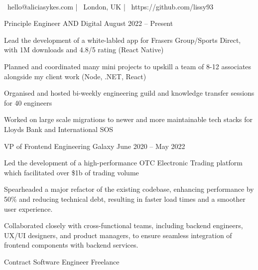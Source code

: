 \documentclass[]{awesome-cv}
\begin{document}
\begin{center}
      \\
    \vspace{2mm}
    {\faEnvelope\ hello@aliciasykes.com} | {\faMapMarker\ London, UK} | {\faLink\ https://github.com/lissy93}
\end{center}


\begin{cventries}
    \cventry
    { Principle Engineer }
    { AND Digital }
    {}
    { August 2022 – Present }
    {\begin{cvitems}
        \item { Lead the development of a white-labled app for Frasers Group/Sports Direct, with 1M downloads and 4.8/5 rating (React Native) }
        \item { Planned and coordinated many mini projects to upskill a team of 8-12 associates alongside my client work (Node, .NET, React) }
        \item { Organised and hosted bi-weekly engineering guild and knowledge transfer sessions for 40 engineers }
        \item { Worked on large scale migrations to newer and more maintainable tech stacks for Lloyds Bank and International SOS }
    \end{cvitems}}
    \cventry
    { VP of Frontend Engineering }
    { Galaxy }
    {}
    { June 2020 – May 2022 }
    {\begin{cvitems}
        \item { Led the development of a high-performance OTC Electronic Trading platform which facilitated over \$1b of trading volume }
        \item { Spearheaded a major refactor of the existing codebase, enhancing performance by 50\% and reducing technical debt, resulting in faster load times and a smoother user experience. }
        \item { Collaborated closely with cross-functional teams, including backend engineers, UX/UI designers, and product managers, to ensure seamless integration of frontend components with backend services. }
    \end{cvitems}}
    \cventry
    { Contract Software Engineer }
    { Freelance }
    {}

\end{cventries}
\end{document}
